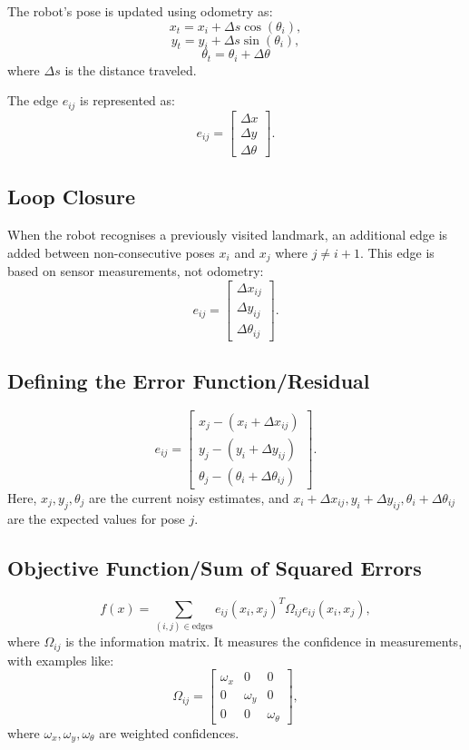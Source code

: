 The robot’s pose is updated using odometry as:
\[
x_{t} = x_{i} + \Delta s \cos(\theta_{i}),
\]
\[
y_{t} = y_{i} + \Delta s \sin(\theta_{i}),
\]
\[
\theta_{t} = \theta_{i} + \Delta \theta
\]
where \(\Delta s\) is the distance traveled.

The edge \(e_{ij}\) is represented as:
\[
e_{ij} =
\begin{bmatrix}
    \Delta x \\
    \Delta y \\
    \Delta \theta
\end{bmatrix}.
\]

\subsection{Loop Closure}

When the robot recognises a previously visited landmark, an additional edge is added between non-consecutive poses \(x_{i}\) and \(x_{j}\) where \(j \neq i + 1\). This edge is based on sensor measurements, not odometry:
\[
e_{ij} = \begin{bmatrix}
    \Delta x_{ij}\\
    \Delta y_{ij}\\
    \Delta \theta_{ij}
\end{bmatrix}.
\]

\subsection{Defining the Error Function/Residual}

\[
e_{ij} =
\begin{bmatrix}
    x_{j} - (x_{i} + \Delta x_{ij}) \\
    y_{j} - (y_{i} + \Delta y_{ij}) \\
    \theta_{j} - (\theta_{i} + \Delta \theta_{ij})
\end{bmatrix}.
\]
Here, \(x_{j}, y_{j}, \theta_{j}\) are the current noisy estimates, and \(x_{i} + \Delta x_{ij}, y_{i} + \Delta y_{ij}, \theta_{i} + \Delta \theta_{ij}\) are the expected values for pose \(j\).

\subsection{Objective Function/Sum of Squared Errors}

\[
f(x) = \sum_{(i,j) \in \text{edges}} e_{ij}(x_{i}, x_{j})^{T} \Omega_{ij} e_{ij}(x_{i}, x_{j}),
\]
where \(\Omega_{ij}\) is the information matrix. It measures the confidence in measurements, with examples like:
\[
\Omega_{ij} =
\begin{bmatrix}
    \omega_x & 0 & 0 \\
    0 & \omega_y & 0 \\
    0 & 0 & \omega_\theta
\end{bmatrix},
\]
where \(\omega_x, \omega_y, \omega_\theta\) are weighted confidences.

